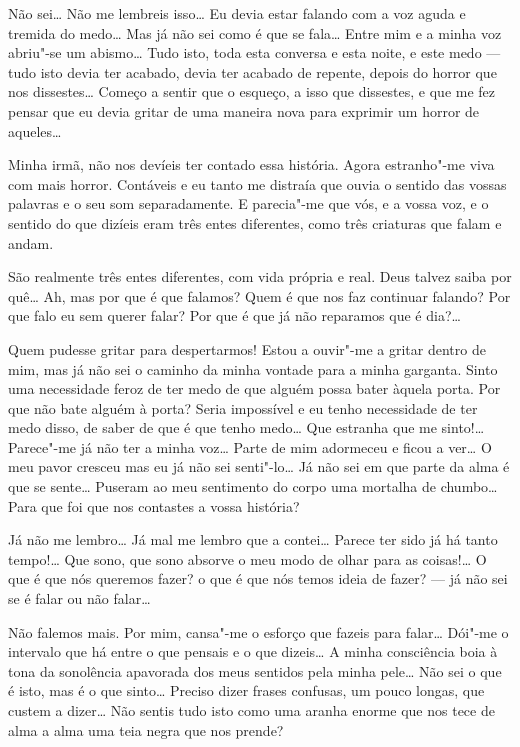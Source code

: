  Não sei\ldots{} Não me lembreis
isso\ldots{} Eu devia estar falando com
a voz aguda e tremida do medo\ldots{} Mas 
já não sei como é que se fala\ldots{}
Entre mim e a minha voz abriu"-se um 
abismo\ldots{} Tudo isto, toda esta
conversa e esta noite, e este medo --- tudo 
isto devia ter acabado, devia
ter acabado de repente, depois do horror que
nos dissestes\ldots{} Começo a
sentir que o esqueço, a isso que dissestes, 
e que me fez pensar que eu
devia gritar de uma maneira nova para exprimir 
um horror de aqueles\ldots{}

  Minha irmã, 
não nos devíeis ter contado essa história. 
Agora estranho"-me viva com mais horror.
Contáveis e eu tanto me distraía que ouvia o sentido das vossas
palavras e o seu som separadamente. E parecia"-me 
que vós, e a vossa voz, e o sentido do que dizíeis 
eram três entes diferentes, como três criaturas que falam e andam. 

 São realmente três entes diferentes, 
com vida própria e real.
Deus talvez saiba por quê\ldots{} Ah,
mas por que é que falamos? Quem é que
nos faz continuar falando? Por que falo 
eu sem querer falar? Por que é
que já não reparamos que é dia?\ldots{}

 Quem pudesse gritar para despertarmos!
Estou a ouvir"-me a gritar dentro de mim, mas já não 
sei o caminho da minha vontade para a minha garganta. 
Sinto uma necessidade feroz de ter medo de que alguém
possa bater àquela porta. Por que não bate alguém à porta?
Seria impossível e eu tenho necessidade de ter medo disso,
de saber de que é que tenho medo\ldots{} Que estranha que
me sinto!\ldots{} Parece"-me já não ter a minha voz\ldots{}
Parte de mim adormeceu e ficou a ver\ldots{} O meu pavor
cresceu mas eu já não sei senti"-lo\ldots{} Já não sei em
que parte da alma é que se sente\ldots{} Puseram ao meu
sentimento do corpo uma mortalha de chumbo\ldots{} 
Para que foi que nos contastes a vossa história?

 Já não me lembro\ldots{} Já mal me 
lembro que a contei\ldots{} Parece
ter sido já há tanto tempo!\ldots{} Que sono, 
que sono absorve o meu modo de
olhar para as coisas!\ldots{} O que é que nós 
queremos fazer? o que é que
nós temos ideia de fazer? --- já não sei se é falar
ou não falar\ldots{}

 Não falemos mais. Por mim, cansa"-me 
o esforço que fazeis
para falar\ldots{} Dói"-me o intervalo que há entre
o que pensais e o que
dizeis\ldots{} A minha consciência boia à tona da
sonolência apavorada dos
meus sentidos pela minha pele\ldots{} 
Não sei o que é isto, mas é o que
sinto\ldots{} Preciso dizer frases 
confusas, um pouco longas, que custem a
dizer\ldots{} Não sentis tudo isto como 
uma aranha enorme que nos tece de
alma a alma uma teia negra que nos prende?

